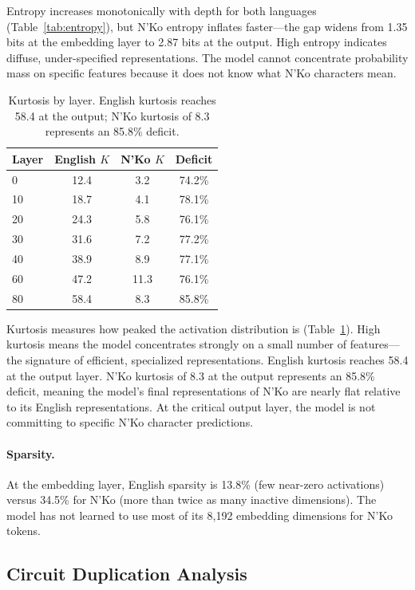 \documentclass[11pt]{article}
\begin{document}
Entropy increases monotonically with depth for both languages (Table~\ref{tab:entropy}), but N'Ko entropy inflates faster---the gap widens from 1.35 bits at the embedding layer to 2.87 bits at the output.
High entropy indicates diffuse, under-specified representations.
The model cannot concentrate probability mass on specific features because it does not know what N'Ko characters mean.

\begin{table}[t]
\centering
\small
\begin{tabular}{lccc}
\toprule
\textbf{Layer} & \textbf{English $K$} & \textbf{N'Ko $K$} & \textbf{Deficit} \\
\midrule
0 & 12.4 & 3.2 & 74.2\% \\
10 & 18.7 & 4.1 & 78.1\% \\
20 & 24.3 & 5.8 & 76.1\% \\
30 & 31.6 & 7.2 & 77.2\% \\
40 & 38.9 & 8.9 & 77.1\% \\
60 & 47.2 & 11.3 & 76.1\% \\
80 & 58.4 & 8.3 & 85.8\% \\
\bottomrule
\end{tabular}
\caption{Kurtosis by layer. English kurtosis reaches 58.4 at the output; N'Ko kurtosis of 8.3 represents an 85.8\% deficit.}
\label{tab:kurtosis}
\end{table}

Kurtosis measures how peaked the activation distribution is (Table~\ref{tab:kurtosis}).
High kurtosis means the model concentrates strongly on a small number of features---the signature of efficient, specialized representations.
English kurtosis reaches 58.4 at the output layer.
N'Ko kurtosis of 8.3 at the output represents an 85.8\% deficit, meaning the model's final representations of N'Ko are nearly flat relative to its English representations.
At the critical output layer, the model is not committing to specific N'Ko character predictions.

\paragraph{Sparsity.}
At the embedding layer, English sparsity is 13.8\% (few near-zero activations) versus 34.5\% for N'Ko (more than twice as many inactive dimensions).
The model has not learned to use most of its 8,192 embedding dimensions for N'Ko tokens.

\subsection{Circuit Duplication Analysis}
\end{document}
